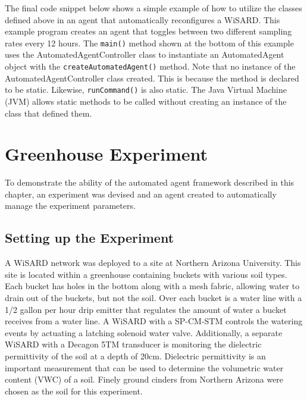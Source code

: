 %
  
 
 
 The final code snippet below shows a simple example of how to utilize the classes defined above in an agent that automatically reconfigures a WiSARD. This example program creates an agent that toggles between two different sampling rates every 12 hours. The \verb|main()| method shown at the bottom of this example uses the AutomatedAgentController class to instantiate an AutomatedAgent object with the \verb|createAutomatedAgent()| method. Note that no instance of the AutomatedAgentController class created. This is because the method is declared to be static. Likewise, \verb|runCommand()| is also static. The Java Virtual Machine (JVM) allows static methods to be called without creating an instance of the class that defined them.
 
 
 
 \section{Greenhouse Experiment}
To demonstrate the ability of the automated agent framework described in this chapter, an experiment was devised and an agent created to automatically manage the experiment parameters. 

\subsection{Setting up the Experiment}
A WiSARD network was deployed to a site at Northern Arizona University. This site is located within a greenhouse containing buckets with various soil types. Each bucket has holes in the bottom along with a mesh fabric, allowing water to drain out of the buckets, but not the soil. Over each bucket is a water line with a 1/2 gallon per hour drip emitter that regulates the amount of water a bucket receives from a water line. A WiSARD with a SP-CM-STM controls the watering events by actuating a latching solenoid water valve. Additionally, a separate WiSARD with a Decagon 5TM transducer is monitoring the dielectric permittivity of the soil at a depth of 20cm. Dielectric permittivity is an important measurement that can be used to determine the volumetric water content (VWC) of a soil. Finely ground cinders from Northern Arizona were chosen as the soil for this experiment.

